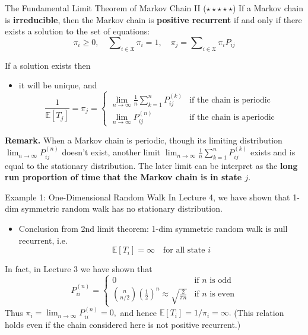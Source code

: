 \documentclass[letterpaper,handout, mathserif]{beamer}
\def\E{\mathbb E}
\def\Sum{\sum\nolimits}
\def\X{\mathfrak{X}}
\begin{document}
\begin{frame}{The Fundamental Limit Theorem of Markov Chain II ($\star\star\star\star\star$)}
If a Markov chain is {\bf irreducible}, then the Markov chain is {\bf positive recurrent} if
and only if there exists a solution to the set of equations:
$$
\pi_i\ge 0,\quad\Sum_{i\in\X}\pi_i=1,\quad\pi_j=\Sum_{i\in\X}\pi_i P_{ij}
$$

If a solution exists then
\begin{itemize}
\item it will be unique, and
$$
\frac{1}{\E [T_j] }=\pi_j=
\begin{cases}
\lim_{n\to\infty}\frac{1}{n}\Sum_{k=1}^n P^{(k)}_{ij} &\mbox{if the chain is periodic}\\
\lim_{n\to\infty} P^{(n)}_{ij}&\mbox{if the chain is aperiodic}
\end{cases}
$$
\end{itemize}
{\bf Remark.} When a Markov chain is periodic, though its limiting distribution
$\lim_{n\to\infty} P^{(n)}_{ij}$ doesn't exist, another limit
$\lim_{n\to\infty}\frac{1}{n}\Sum_{k=1}^n P^{(k)}_{ij}$ exists and
is equal to the stationary distribution.
The later limit can be interpret as the {\bf long run proportion of time that
the Markov chain is in state $j$}.
\end{frame}
\begin{frame}{Example 1: One-Dimensional Random Walk}
In Lecture 4, we have shown that 1-dim symmetric random walk has no stationary distribution.
\begin{itemize}
\item Conclusion from 2nd limit theorem: 1-dim symmetric random walk is null recurrent, i.e. $$\E[T_i]=\infty\quad\text{for all state }i$$
\end{itemize}
In fact, in Lecture 3 we have shown that
$$
P^{(n)}_{ii}=
\begin{cases}
0 & \text{if $n$ is odd}\\
{n\choose n/2}(\frac{1}{2})^n\approx\sqrt{\frac{2}{\pi n}} & \text{if $n$ is even}
\end{cases}
$$
Thus $\pi_i = \lim_{n\to\infty}P^{(n)}_{ii} = 0,$ and hence $\E[T_i]=1/\pi_i=\infty.$ (This relation holds even if the chain considered here is not positive recurrent.)
\end{frame}
\end{document}
